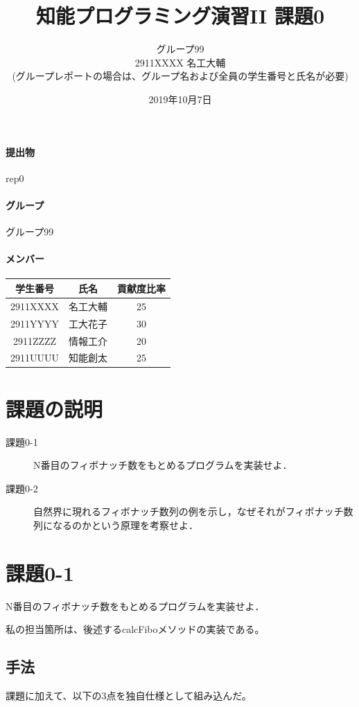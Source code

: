 \documentclass[a4j]{jarticle}
\title{知能プログラミング演習II 課題0}
\author{グループ99\\
  2911XXXX 名工大輔\\
  {\small (グループレポートの場合は、グループ名および全員の学生番号と氏名が必要)}
}
\date{2019年10月7日}
\begin{document}
\maketitle

\paragraph{提出物} rep0
\paragraph{グループ} グループ99
\paragraph{メンバー}
\begin{tabular}{|c|c|c|}
  \hline
  学生番号&氏名&貢献度比率\\
  \hline\hline
  2911XXXX&名工大輔&25\\
  \hline
  2911YYYY&工大花子&30\\
  \hline
  2911ZZZZ&情報工介&20\\
  \hline
  2911UUUU&知能創太&25\\
  \hline
\end{tabular}



\section{課題の説明}
\begin{description}
\item[課題0-1] N番目のフィボナッチ数をもとめるプログラムを実装せよ．
\item[課題0-2] 自然界に現れるフィボナッチ数列の例を示し，なぜそれがフィボナッチ数列になるのかという原理を考察せよ．
\end{description}


\section{課題0-1}
\begin{screen}
  N番目のフィボナッチ数をもとめるプログラムを実装せよ．
\end{screen}

私の担当箇所は、後述するcalcFiboメソッドの実装である。
\subsection{手法}
課題に加えて、以下の3点を独自仕様として組み込んだ。
\end{document}
